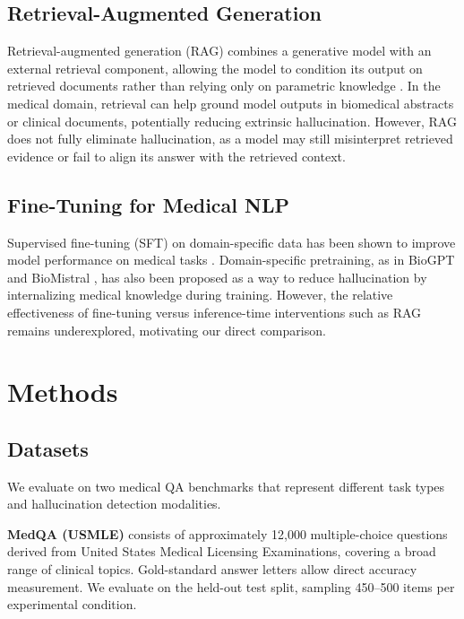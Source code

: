 \documentclass[11pt]{article}
\begin{document}
\subsection{Retrieval-Augmented Generation}
Retrieval-augmented generation (RAG) combines a generative model with 
an external retrieval component, allowing the model to condition its 
output on retrieved documents rather than relying only on parametric 
knowledge \cite{lewis2020retrieval}. In the medical domain, retrieval 
can help ground model outputs in biomedical abstracts or clinical 
documents, potentially reducing extrinsic hallucination. However, RAG 
does not fully eliminate hallucination, as a model may still 
misinterpret retrieved evidence or fail to align its answer with the 
retrieved context.

\subsection{Fine-Tuning for Medical NLP}
Supervised fine-tuning (SFT) on domain-specific data has been shown to 
improve model performance on medical tasks \cite{singhal2023large}. 
Domain-specific pretraining, as in BioGPT \cite{luo2022biogpt} and 
BioMistral \cite{labrak2024biomistral}, has also been proposed as a way 
to reduce hallucination by internalizing medical knowledge during 
training. However, the relative effectiveness of fine-tuning versus 
inference-time interventions such as RAG remains underexplored, 
motivating our direct comparison.

\section{Methods}

\subsection{Datasets}
We evaluate on two medical QA benchmarks that represent different task 
types and hallucination detection modalities.

\textbf{MedQA (USMLE)} \cite{jin2021disease} consists of approximately 
12,000 multiple-choice questions derived from United States Medical 
Licensing Examinations, covering a broad range of clinical topics. 
Gold-standard answer letters allow direct accuracy measurement. We 
evaluate on the held-out test split, sampling 450--500 items per 
experimental condition.
\end{document}
